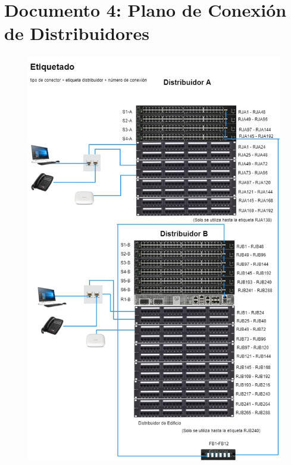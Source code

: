 \documentclass[]{article}
\begin{document}
\section{Documento 4: Plano de Conexión de Distribuidores}
\begin{figure}[H]
\centering
\includegraphics[scale=0.40]{d4}
\caption{}
\end{figure}


\end{document}
